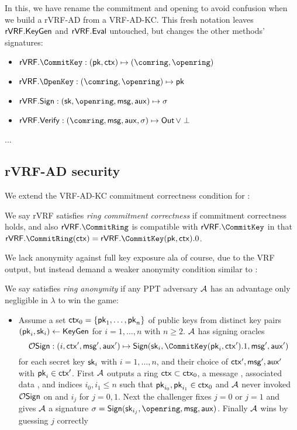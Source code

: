\def\rSign{\Sign}
\def\rVerify{\Verify}

In this, we have rename the commitment and opening to avoid confusion
when we build a rVRF-AD from a VRF-AD-KC.  This fresh notation leaves
${\mathsf{rVRF}}.{\mathsf{KeyGen}}$ and ${\mathsf{rVRF}}.{\mathsf{Eval}}$ untouched, but
 changes the other methods' signatures:
\begin{itemize}
\item $\rVRF.\CommitKey : (\pk,\ctx) \mapsto (\comring,\openring)$
\item $\rVRF.\OpenKey : (\comring,\openring) \mapsto \pk$
\item $\rVRF.\rSign : (\sk,\openring,\msg,\aux) \mapsto \sigma$
\item $\rVRF.\rVerify : (\comring,\msg,\aux,\sigma) \mapsto \Out \, \lor \perp$
\end{itemize}

...


\subsection{rVRF-AD security}

We extend the VRF-AD-KC commitment correctness condition for \CommitRing:

\begin{definition}
We say rVRF satisfies {\em ring commitment correctness} if
commitment correctness holds, and also $\rVRF.\CommitRing$ is 
 compatible with $\rVRF.\CommitKey$ in that
  $\rVRF.\CommitRing(\ctx) = \rVRF.\CommitKey(\pk,\ctx).0$.
\end{definition}

We lack anonymity against full key exposure ala
 \cite[pp. 6 Def. 4]{cryptoeprint:2005:304} of course, due to the VRF output,
but instead demand a weaker anonymity condition similar to
 \cite[pp. 5 Def. 3]{cryptoeprint:2005:304}:

\begin{definition}
We say \rVRF satisfies {\em ring anonymity} if
any PPT adversary $\mathcal{A}$ has an advantage only
 negligible in $\lambda$ to win the game:
\begin{itemize}
\item[]
 Assume a set $\mathsf{ctx}_0 = \{ \mathsf{pk}_1,\ldots,\mathsf{pk}_n \}$ of public keys from
 distinct key pairs $(\mathsf{pk}_i,\mathsf{sk}_i) \leftarrow {\ensuremath{\mathsf{KeyGen}}}$ for $i=1,\ldots,n$ with $n \ge 2$.
 $\mathcal{A}$ has signing oracles
 $$ \ora{Sign} : (i,\ctx',\msg',\aux') \mapsto
  \rSign(\sk_i,\CommitKey(\pk_i,\ctx').1,\msg',\aux') $$
 for each secret key $\mathsf{sk}_i$ with $i=1,\ldots,n$, and
 their choice of $\mathsf{ctx}',\mathsf{msg}',\mathsf{aux}'$ with $\mathsf{pk}_i \in \mathsf{ctx}'$.
 First $\mathcal{A}$ outputs a ring $\mathsf{ctx} \subset \mathsf{ctx}_0$,
 a message \msg, associated data \aux, and
 indices $i_0,i_1 \le n$ such that $\mathsf{pk}_{i_0},\mathsf{pk}_{i_1} \in \mathsf{ctx}_0$ and 
 $\mathcal{A}$ never invoked $\mathcal{O}\mathsf{Sign}$ on \msg and $i_j$ for $j=0,1$.
 Next the challenger fixes $j=0$ or $j=1$ and gives
  $\mathcal{A}$ a signature $\sigma = \rSign(\sk_{i_j},\openring,\msg,\aux)$.
 Finally $\mathcal{A}$ wins by guessing $j$ correctly
\end{itemize}
\end{definition}

